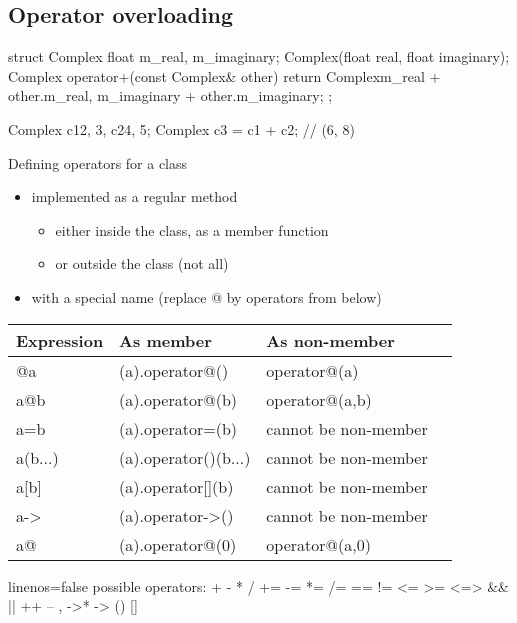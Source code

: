 \subsection[Op]{Operator overloading}

\begin{frame}[fragile]
  \begin{cppcode}
    struct Complex {
      float m_real, m_imaginary;
      Complex(float real, float imaginary);
      Complex operator+(const Complex& other) {
        return Complex{m_real + other.m_real,
                       m_imaginary + other.m_imaginary};
      }
    };

    Complex c1{2, 3}, c2{4, 5};
    Complex c3 = c1 + c2; // (6, 8)
  \end{cppcode}
\end{frame}

\begin{frame}[fragile]
  \begin{block}{Defining operators for a class}
    \begin{itemize}
    \item implemented as a regular method
      \begin{itemize}
      \item \small either inside the class, as a member function
      \item or outside the class (not all)
      \end{itemize}
    \item with a special name (replace @ by operators from below)\small
    \end{itemize}
    \begin{tabular}{llll}
      Expression & As member & As non-member \\
      \hline
      @a & (a).operator@() & operator@(a) \\
      a@b & (a).operator@(b) & operator@(a,b) \\
      a=b & (a).operator=(b) & cannot be non-member \\
      a(b...) & (a).operator()(b...) & cannot be non-member \\
      a[b] & (a).operator[](b) & cannot be non-member \\
      a-\textgreater & (a).operator-\textgreater() & cannot be non-member \\
      a@ & (a).operator@(0) & operator@(a,0) \\
      \hline
    \end{tabular}

    \small
    \begin{cppcode*}{linenos=false}
      possible operators: + - * / %
          += -= *= /= %
          == != <= >= <=> && || ++ -- , ->* -> () []
    \end{cppcode*}
  \end{block}
\end{frame}

